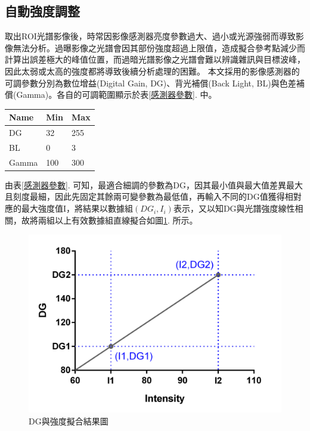 \subsection{自動強度調整}
取出ROI光譜影像後，時常因影像感測器亮度參數過大、過小或光源強弱而導致影像無法分析。過曝影像之光譜會因其部份強度超過上限值，造成擬合參考點減少而計算出誤差極大的峰值位置，而過暗光譜影像之光譜會難以辨識雜訊與目標波峰，因此太弱或太高的強度都將導致後續分析處理的困難。
本文採用的影像感測器的可調參數分別為數位增益(Digital Gain, DG)、背光補償(Back Light, BL)與色差補償(Gamma)。各自的可調範圍顯示於表\ref{感測器參數}. 中。
\begin{center}
\vspace{0.8cm}
\label{感測器參數}
\begin{tabularx}{\textwidth}{m{}<{\centering} m{}<{\centering} m{}<{\centering}}
	\hline\hline
	Name & Min & Max \\
	\hline
	DG & 32 & 255 \\
	\hline
	BL & 0 & 3\\
	\hline
	Gamma & 100 & 300 \\
	\hline\hline
\end{tabularx}
\vspace{10pt}
\end{center}
\par
由表\ref{感測器參數}. 可知，最適合細調的參數為DG\cite{DG}，因其最小值與最大值差異最大且刻度最細，因此先固定其餘兩可變參數為最低值，再輸入不同的DG值獲得相對應的最大強度值I，將結果以數據組$(DG_i,I_i)$表示，又以知DG與光譜強度線性相關，故將兩組以上有效數據組直線擬合如圖\ref{DG與強度擬合結果圖}. 所示。
\begin{figure}[H] %
	\centering %
	\vspace{0.8cm}
	\setlength{\abovecaptionskip}{0.cm}
	\includegraphics[width=13cm]{figures/AutoScaling.PNG} %
	\caption{DG與強度擬合結果圖} %
	\label{DG與強度擬合結果圖} %
\end{figure}
